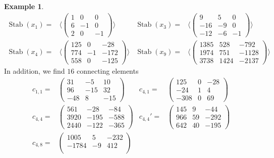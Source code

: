 \documentclass[10pt, preprint]{elsarticle}
\theoremstyle{definition}
\newtheorem{example}[theorem]{Example}
\theoremstyle{definition}
\newcommand{\Stab}{\operatorname{Stab}}
\begin{document}
\begin{example}
\begin{align*}
\Stab(x_1)=& \langle \begin{pmatrix}
1 & 0 & 0 \\
6 & -1 & 0 \\
2 & 0 & -1
\end{pmatrix}
\rangle & \Stab(x_3)=&\langle \begin{pmatrix}
9 & 5 & 0 \\
-16 & -9 & 0 \\
-12 & -6 & -1
\end{pmatrix}
\rangle \\
\Stab(x_4)=& \langle \begin{pmatrix}
125 & 0 & -28 \\
774 & -1 & -172 \\
558 & 0 & -125
\end{pmatrix}
\rangle & \Stab(x_9)=& \langle \begin{pmatrix}
1385 & 528 & -792 \\
1974 & 751 & -1128 \\
3738 & 1424 & -2137
\end{pmatrix}
\rangle
\end{align*}
In addition, we find $16$ connecting elements
{\allowdisplaybreaks
\begin{align*}
c_{1,1}=& \begin{pmatrix}
31 & -5 & 10 \\
96 & -15 & 32 \\
-48 & 8 & -15
\end{pmatrix}
& c_{4,1}=& \begin{pmatrix}
125 & 0 & -28 \\
-24 & 1 & 4 \\
-308 & 0 & 69
\end{pmatrix}\\
c_{4,4}=& \begin{pmatrix}
561 & -28 & -84 \\
3920 & -195 & -588 \\
2440 & -122 & -365
\end{pmatrix}
& c_{4,4}'=& \begin{pmatrix}
145 & 9 & -44 \\
966 & 59 & -292 \\
642 & 40 & -195
\end{pmatrix}
\\
c_{4,8}=&\begin{pmatrix}
1005 & 5 & -232 \\
-1784 & -9 & 412 \\

\end{pmatrix}
\end{align*}}
\end{example}
\end{document}
